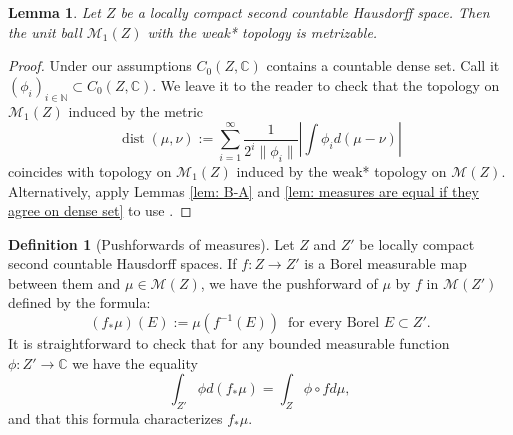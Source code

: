 \documentclass[reqno,11pt, twoside]{amsart}
\theoremstyle{plain}
\newtheorem{lem}[thm]{Lemma}
\theoremstyle{definition}
\newtheorem{defn}[thm]{Definition}
\theoremstyle{definition}
\theoremstyle{remark}
\numberwithin{equation}{section}
\newcommand{\dist}{\operatorname{dist}}
\newcommand{\Co}{{\mathbb{C}}}
\newcommand{\N}{{\mathbb{N}}}
\newcommand{\ignore}[1]{{}}
\begin{document}
\begin{lem}\label{lem: unit ball is metrizable}
    Let $Z$ be a locally compact second countable Hausdorff space. Then the unit ball $\mathcal{M}_1(Z)$ with the weak* topology is metrizable.
\end{lem}
\begin{proof}
    Under our assumptions $C_0(Z,\Co)$ contains a countable dense set. Call it $(\phi_i)_{i \in \N} \subset C_0(Z,\Co)$. We leave it to the reader to check that the topology on $\mathcal{M}_1(Z)$ induced by the metric
    \begin{equation*}
        \dist(\mu, \nu) := \sum_{i=1}^\infty \frac{1}{2^i \|\phi_i\|} \left| \int \phi_i d(\mu - \nu) \right|
    \end{equation*}
coincides with  topology on $\mathcal{M}_1(Z)$ induced by the weak* topology on $\mathcal{M}(Z)$.
Alternatively, apply Lemmas \ref{lem: B-A} and \ref{lem: measures are equal if they agree on dense set} to use \cite[(c) of page 63]{Ru-FA}.
\end{proof}

\begin{defn}[Pushforwards of measures]\label{defn: pushforward}
    Let $Z$ and $Z'$ be locally compact second countable Hausdorff spaces. If $f: Z \to Z'$ is a Borel measurable map between them and $\mu \in \mathcal{M}(Z)$, we have the pushforward of $\mu$ by $f$ in $\mathcal{M}(Z')$ defined by the formula:
    \begin{equation*}
        (f_*\mu) (E) := \mu(f^{-1}(E))\ \text{ for every Borel } E \subset Z'.
    \end{equation*}
    It is straightforward to check that for any bounded measurable function $\phi: Z' \to \Co$ we have the equality
    \begin{equation*}
        \int_{Z'} \phi d(f_* \mu) = \int_Z \phi \circ f d\mu,
    \end{equation*}
    and that this formula characterizes
    $f_*\mu$.
\end{defn}
    \ignore{Note, in the above definition, complex Borel measures are automatically regular and Radon by \cite[Theorem 2.18]{Ru-RACA}.}
\end{document}
